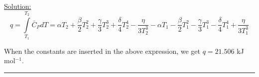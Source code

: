\noindent
\underline{Solution:}\\

$$q = \int\limits_{T_1}^{T_2}\bar{C}_PdT = \alpha T_2 + \frac{\beta}{2} T_2^2 + \frac{\gamma}{3} T_2^3 + \frac{\delta}{4} T_2^4 - \frac{\eta}{3T_2^3} - \alpha T_1 - \frac{\beta}{2} T_1^2 - \frac{\gamma}{3} T_1^3 - \frac{\delta}{4} T_1^4 + \frac{\eta}{3T_1^3}$$

When the constants are inserted in the above expression, we get $q = 21.506$ kJ mol$^{-1}$.

\hrule\vspace{0.5cm}
